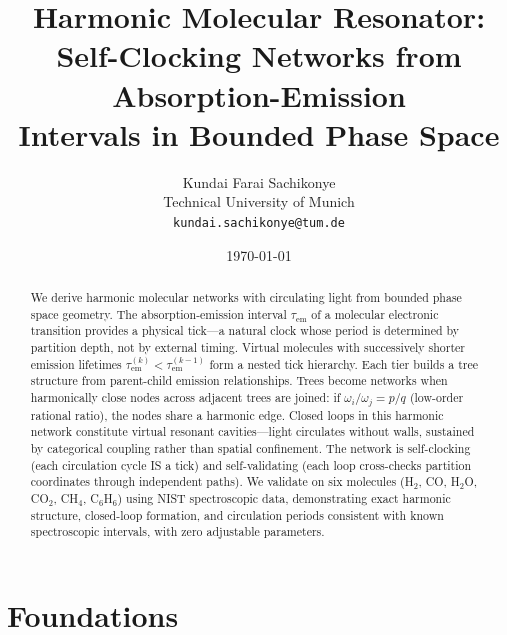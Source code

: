 \documentclass[11pt,a4paper]{article}
\theoremstyle{definition}
\theoremstyle{remark}
\newcommand{\tem}{\tau_{\mathrm{em}}}
\begin{document}
\title{\textbf{Harmonic Molecular Resonator: \\
Self-Clocking Networks from Absorption-Emission \\
Intervals in Bounded Phase Space}}

\author{
Kundai Farai Sachikonye\\
Technical University of Munich\\
\texttt{kundai.sachikonye@tum.de}
}

\date{\today}

\maketitle

\begin{abstract}
We derive harmonic molecular networks with circulating light from bounded phase space geometry. The absorption-emission interval $\tem$ of a molecular electronic transition provides a physical tick---a natural clock whose period is determined by partition depth, not by external timing. Virtual molecules with successively shorter emission lifetimes $\tem^{(k)} < \tem^{(k-1)}$ form a nested tick hierarchy. Each tier builds a tree structure from parent-child emission relationships. Trees become networks when harmonically close nodes across adjacent trees are joined: if $\omega_i/\omega_j = p/q$ (low-order rational ratio), the nodes share a harmonic edge. Closed loops in this harmonic network constitute virtual resonant cavities---light circulates without walls, sustained by categorical coupling rather than spatial confinement. The network is self-clocking (each circulation cycle IS a tick) and self-validating (each loop cross-checks partition coordinates through independent paths). We validate on six molecules (H$_2$, CO, H$_2$O, CO$_2$, CH$_4$, C$_6$H$_6$) using NIST spectroscopic data, demonstrating exact harmonic structure, closed-loop formation, and circulation periods consistent with known spectroscopic intervals, with zero adjustable parameters.
\end{abstract}

\tableofcontents
\newpage


\part{Foundations}
\end{document}
